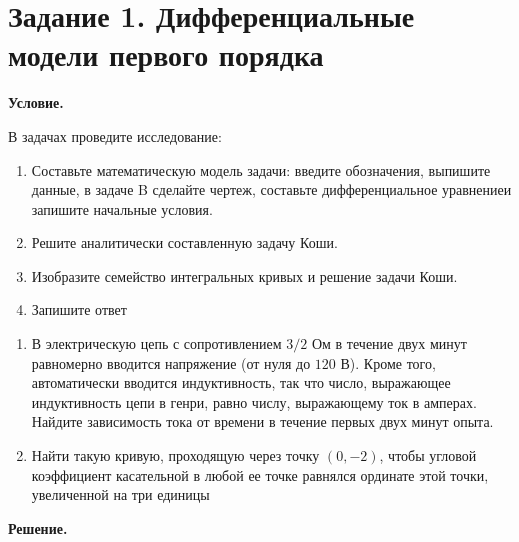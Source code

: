 \section{Задание 1. Дифференциальные модели первого порядка}

\textbf{Условие.}

В задачах проведите исследование:

\begin{enumerate}
    \item Составьте математическую модель задачи: введите обозначения, выпишите данные, в задаче B сделайте чертеж, составьте дифференциальное уравнениеи запишите начальные условия.
    \item Решите аналитически составленную задачу Коши.
    \item Изобразите семейство интегральных кривых и решение задачи Коши.
    \item Запишите ответ
\end{enumerate}

\begin{enumerate}[label=\Alph*.]
    \item В электрическую цепь с сопротивлением $3/2$ Ом в течение двух минут равномерно вводится напряжение (от нуля до $120$ В).
    Кроме того, автоматически вводится индуктивность, так что число, выражающее индуктивность цепи в генри, равно числу,
    выражающему ток в амперах.
    Найдите зависимость тока от времени в течение первых двух минут опыта.

    \item Найти такую кривую, проходящую через точку $(0, -2)$, чтобы угловой коэффициент касательной в любой ее точке равнялся
    ординате этой точки, увеличенной на три единицы
\end{enumerate}

\vspace{10mm}
\textbf{Решение.}

